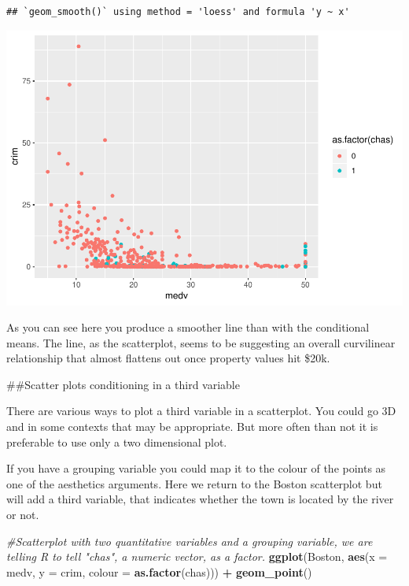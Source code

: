 \documentclass[]{book}
\newenvironment{Shaded}{\begin{snugshade}}{\end{snugshade}}
\newcommand{\CommentTok}[1]{\textcolor[rgb]{0.56,0.35,0.01}{\textit{#1}}}
\newcommand{\DataTypeTok}[1]{\textcolor[rgb]{0.13,0.29,0.53}{#1}}
\newcommand{\KeywordTok}[1]{\textcolor[rgb]{0.13,0.29,0.53}{\textbf{#1}}}
\newcommand{\NormalTok}[1]{#1}
\newcommand{\OperatorTok}[1]{\textcolor[rgb]{0.81,0.36,0.00}{\textbf{#1}}}
\newcommand{\StringTok}[1]{\textcolor[rgb]{0.31,0.60,0.02}{#1}}
\theoremstyle{definition}
\theoremstyle{definition}
\theoremstyle{definition}
\theoremstyle{remark}
\begin{document}
\begin{verbatim}
## `geom_smooth()` using method = 'loess' and formula 'y ~ x'
\end{verbatim}

\includegraphics{03-visualisation_files/figure-latex/unnamed-chunk-43-1.pdf}

As you can see here you produce a smoother line than with the
conditional means. The line, as the scatterplot, seems to be suggesting
an overall curvilinear relationship that almost flattens out once
property values hit \$20k.

\#\#Scatter plots conditioning in a third variable

There are various ways to plot a third variable in a scatterplot. You
could go 3D and in some contexts that may be appropriate. But more often
than not it is preferable to use only a two dimensional plot.

If you have a grouping variable you could map it to the colour of the
points as one of the aesthetics arguments. Here we return to the Boston
scatterplot but will add a third variable, that indicates whether the
town is located by the river or not.

\begin{Shaded}
\begin{Highlighting}[]
\CommentTok{#Scatterplot with two quantitative variables and a grouping variable, we are telling R to tell "chas", a numeric vector, as a factor. }
\KeywordTok{ggplot}\NormalTok{(Boston, }\KeywordTok{aes}\NormalTok{(}\DataTypeTok{x =}\NormalTok{ medv, }\DataTypeTok{y =}\NormalTok{ crim, }\DataTypeTok{colour =} \KeywordTok{as.factor}\NormalTok{(chas))) }\OperatorTok{+}
\StringTok{  }\KeywordTok{geom_point}\NormalTok{() }
\end{Highlighting}
\end{Shaded}
\end{document}
